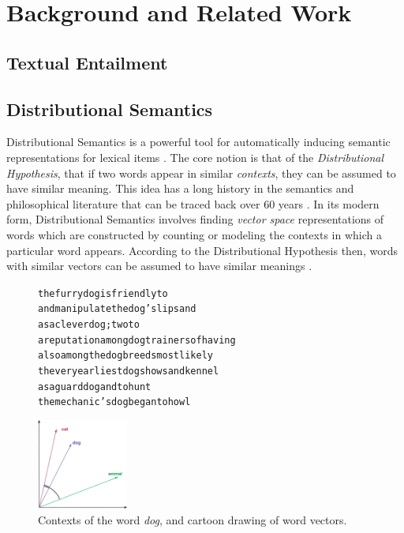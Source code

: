 \documentclass[letterpaper]{article}
\begin{document}
\section{Background and Related Work}

\subsection{Textual Entailment}

\subsection{Distributional Semantics}
Distributional Semantics is a powerful tool for automatically inducing semantic
representations for lexical items \cite{turney:2010:jair,erk:2012:llc}.  The
core notion is that of the {\em Distributional Hypothesis}, that if two words
appear in similar {\em contexts}, they can be assumed to have similar meaning.
This idea has a long history in the semantics and philosophical literature that
can be traced back over 60 years
\cite{wittgenstein:1953:pi,harris:1954:word,firth:1957:la}. In its modern form,
Distributional Semantics involves finding {\em vector space} representations of
words which are constructed by counting or modeling the contexts in which a
particular word appears. According to the Distributional Hypothesis then, words
with similar vectors can be assumed to have similar meanings
\cite{turney:2010:jair}.

\begin{figure}
\centering
\begin{minipage}{7cm}
\begin{scriptsize}
\begin{alltt}
         the furry {dog} is friendly to
and manipulate the {dog} 's lips and
       as a clever {dog} ; two to
a reputation among {dog} trainers of having
    also among the {dog} breeds most likely
 the very earliest {dog} shows and kennel
        as a guard {dog} and to hunt
   the mechanic 's {dog} began to howl
\end{alltt}
\end{scriptsize}
\end{minipage}\qquad
\begin{minipage}{3cm}
\includegraphics[width=3cm]{figures/vsm}
\end{minipage}
\caption{Contexts of the word {\em dog}, and cartoon drawing
of word vectors.}
\label{fig:vsm}
\end{figure}
\end{document}
